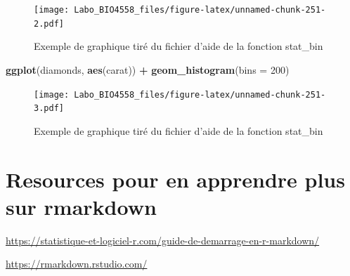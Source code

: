 \documentclass[12pt,]{book}
\newenvironment{Shaded}{\begin{snugshade}}{\end{snugshade}}
\newcommand{\DataTypeTok}[1]{\textcolor[rgb]{0.27,0.27,0.27}{#1}}
\newcommand{\DecValTok}[1]{\textcolor[rgb]{0.06,0.06,0.06}{#1}}
\newcommand{\KeywordTok}[1]{\textcolor[rgb]{0.27,0.27,0.27}{\textbf{#1}}}
\newcommand{\NormalTok}[1]{#1}
\newcommand{\OperatorTok}[1]{\textcolor[rgb]{0.43,0.43,0.43}{\textbf{#1}}}
\newcommand{\StringTok}[1]{\textcolor[rgb]{0.5,0.5,0.5}{#1}}
\begin{document}
\begin{figure}
\centering
\texttt{[image: Labo\_BIO4558\_files/figure-latex/unnamed-chunk-251-2.pdf]}
\caption{\label{fig:unnamed-chunk-251-2}Exemple de graphique tiré du fichier d'aide de la fonction stat\_bin}
\end{figure}

\begin{Shaded}
\begin{Highlighting}[]
\KeywordTok{ggplot}\NormalTok{(diamonds, }\KeywordTok{aes}\NormalTok{(carat)) }\OperatorTok{+}
\StringTok{  }\KeywordTok{geom_histogram}\NormalTok{(}\DataTypeTok{bins =} \DecValTok{200}\NormalTok{)}
\end{Highlighting}
\end{Shaded}

\begin{figure}
\centering
\texttt{[image: Labo\_BIO4558\_files/figure-latex/unnamed-chunk-251-3.pdf]}
\caption{\label{fig:unnamed-chunk-251-3}Exemple de graphique tiré du fichier d'aide de la fonction stat\_bin}
\end{figure}

\hypertarget{resources-pour-en-apprendre-plus-sur-rmarkdown}{%
\chapter{Resources pour en apprendre plus sur rmarkdown}\label{resources-pour-en-apprendre-plus-sur-rmarkdown}}

\url{https://statistique-et-logiciel-r.com/guide-de-demarrage-en-r-markdown/}

\url{https://rmarkdown.rstudio.com/}

\printindex
\end{document}
